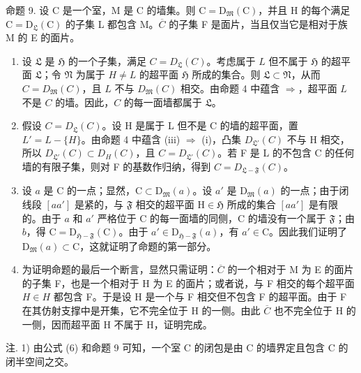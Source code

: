 命题 9. 设 C 是一个室，M 是 C 的墙集。则 \(\mathrm{C} = \mathrm{D}_{\mathfrak{M}}(\mathrm{C})\)，并且 H 的每个满足 \(\mathrm{C} = \mathrm{D}_{\mathfrak{L}}(\mathrm{C})\) 的子集 L 都包含 M。\(\overline{C}\) 的子集 F 是面片，当且仅当它是相对于族 M 的 E 的面片。

\begin{enumerate}
\def\labelenumi{\alph{enumi})}
\item
  设 \(\mathfrak{L}\) 是 \(\mathfrak{H}\) 的一个子集，满足 \(C = D_{\mathfrak{L}}(C)\)。考虑属于 \(L\) 但不属于 \(\mathfrak{H}\) 的超平面 \(\mathfrak{L}\)；令 \(\mathfrak{N}\) 为属于 \(H \neq L\) 的超平面 \(\mathfrak{H}\) 所成的集合。则 \(\mathfrak{L} \subset \mathfrak{N}\)，从而 \(C = D_{\mathfrak{M}}(C)\)，且 \(L\) 不与 \(D_{\mathfrak{M}}(C)\) 相交。由命题 4 中蕴含 \(\Longrightarrow\)，超平面 \(L\) 不是 \(C\) 的墙。因此，\(C\) 的每一面墙都属于 \(\mathfrak{L}\)。
\item
  假设 \(C = D_{\mathfrak{L}}(C)\)。设 H 是属于 L 但不是 C 的墙的超平面，置 \(L' = L - \{H\}\)。由命题 4 中蕴含 (iii) \(\Longrightarrow\) (i)，凸集 \(D_{\mathfrak{L}'}(C)\) 不与 H 相交，所以 \(D_{\mathfrak{L}'}(C) \subset D_{H}(C)\)，且 \(C = D_{\mathfrak{L}'}(C)\)。若 F 是 L 的不包含 C 的任何墙的有限子集，则对 F 的基数作归纳，得到 \(C = D_{\mathfrak{L} - \mathfrak{F}}(C)\)。
\item
  设 \(a\) 是 C 的一点；显然，\(\mathrm{C} \subset \mathrm{D}_{\mathfrak{M}}(a)\)。设 \(a'\) 是 \(\mathrm{D}_{\mathfrak{M}}(a)\) 的一点；由于闭线段 \([aa']\) 是紧的，与 \(\mathfrak{F}\) 相交的超平面 \(\mathrm{H} \in \mathfrak{H}\) 所成的集合 \([aa']\) 是有限的。由于 \(a\) 和 \(a'\) 严格位于 C 的每一面墙的同侧，C 的墙没有一个属于 \(\mathfrak{F}\)；由 \(b\)，得 \(\mathrm{C} = \mathrm{D}_{\mathfrak{H}-\mathfrak{F}}(\mathrm{C})\)。由于 \(a' \in \mathrm{D}_{\mathfrak{H}-\mathfrak{F}}(a)\)，有 \(a' \in \mathrm{C}\)。因此我们证明了 \(\mathrm{D}_{\mathfrak{M}}(a) \subset \mathrm{C}\)，这就证明了命题的第一部分。
\item
  为证明命题的最后一个断言，显然只需证明：\(\overline{C}\) 的一个相对于 M 为 E 的面片的子集 F，也是一个相对于 H 为 E 的面片；或者说，与 F 相交的每个超平面 \(H \in H\) 都包含 F。于是设 H 是一个与 F 相交但不包含 F 的超平面。由于 F 在其仿射支撑中是开集，它不完全位于 H 的一侧。由此 \(\overline{C}\) 也不完全位于 H 的一侧，因而超平面 H 不属于 H，证明完成。
\end{enumerate}

注. 1) 由公式 (6) 和命题 9 可知，一个室 C 的闭包是由 C 的墙界定且包含 C 的闭半空间之交。

